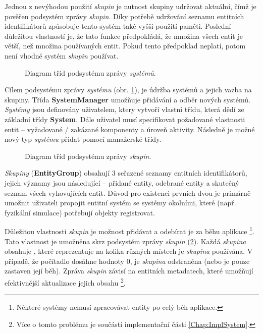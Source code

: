 Jednou z nevýhodou použití \emph{skupin} je nutnost skupiny udržovat aktuální, čímž je pověřen podsystém zprávy \emph{skupin}. Díky potřebě udržování seznamu entitních identifikátorů způsobuje tento systém také vyšší použití paměti. Poslední důležitou vlastností je, že tato funkce předpokládá, že množina všech entit je větší, než množina používaných entit. Pokud tento předpoklad neplatí, potom není vhodné systém \emph{skupin} používat.

\begin{figure}[H]
	\caption{Diagram tříd podsystému zprávy \emph{systémů}.}
	\label{Fig:DESSystemDiagram}
\end{figure}

Cílem podsystému zprávy \emph{systému} (obr. \ref{Fig:DESSystemDiagram}), je údržba systémů a jejich vazba na skupiny. Třída \textbf{SystemManager} umožňuje přidávání a odběr nových systémů. \emph{Systémy} jsou definovány uživatelem, ktery vytvoří vlastní třídu, která dědí ze základní třídy \textbf{System}. Dále uživatel musí specifikovat požadované vlastnosti entit -- vyžadované / zakázané komponenty a úroveň aktivity. Následně je možné nový typ \emph{systému} přidat pomocí manažerské třídy. 

\begin{figure}[H]
	\caption{Diagram tříd podsystému zprávy \emph{skupin}.}
	\label{Fig:DESGroupDiag}
\end{figure}

\emph{Skupiny} (\textbf{EntityGroup}) obsahují 3 seřazené seznamy entitních identifikátorů, jejich významy jsou následující -- přidané entity, odebrané entity a skutečný seznam všech vyhovujících entit. Důvod pro existenci prvních dvou je primárně umožnit uživateli propojit entitní systém se systémy okolními, které (např. fyzikální simulace) potřebují objekty registrovat.

Důležitou vlastnosti \emph{skupin} je možnost přidávat a odebírat je za běhu aplikace \footnote{Některé systémy nemusí zpracovávat entity po celý běh aplikace.}. Tato vlastnost je umožněna skrz podsystém zprávy \emph{skupin} (\ref{Fig:DESGroupDiag}). Každá \emph{skupina} obsahuje , které reprezentuje na kolika různých místech je \emph{skupina} používána. V případě, že počítadlo dosáhne hodnoty 0, je \emph{skupina} odstraněna (nebo je pouze zastaven její běh). Zpráva \emph{skupin} závisí na entitních metadatech, které umožňují efektivnější aktualizace jejich obsahu \footnote{Více o tomto problému je součástí implementační části \ref{Chap:ImplSystem}.}.

